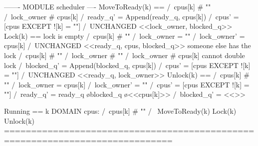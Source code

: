 \documentclass{report}
\begin{document}
\begin{tla}
------- MODULE scheduler ---- 
MoveToReady(k) == 
    /\ cpus[k] # "" 
    /\ lock_owner # cpus[k]
    /\ ready_q' = Append(ready_q, cpus[k]) 
    /\ cpus' = [cpus EXCEPT ![k] = ""]
    /\ UNCHANGED <<lock_owner, blocked_q>>
Lock(k) == 
    \* lock is empty
    \/  /\ cpus[k] # "" 
        /\ lock_owner = ""
        /\ lock_owner' = cpus[k]
        /\ UNCHANGED <<ready_q, cpus, blocked_q>>
    \* someone else has the lock
    \/  /\ cpus[k] # "" 
        /\ lock_owner # ""
        /\ lock_owner # cpus[k] \* cannot double lock
        /\ blocked_q' = Append(blocked_q, cpus[k])
        /\ cpus' = [cpus EXCEPT ![k] = ""]
        /\ UNCHANGED <<ready_q, lock_owner>>
Unlock(k) == 
    /\ cpus[k] # "" 
    /\ lock_owner = cpus[k]
    /\ lock_owner' = ""
    /\ cpus' = [cpus EXCEPT ![k] = ""]
    /\ ready_q' = ready_q \o blocked_q \o <<cpus[k]>>
    /\ blocked_q' = <<>>

Running == 
    \E k \in DOMAIN cpus:
        /\ cpus[k] # "" 
        /\ \/ MoveToReady(k)
           \/ Lock(k)
           \/ Unlock(k)
=============================================================================
\end{tla}
\end{document}
